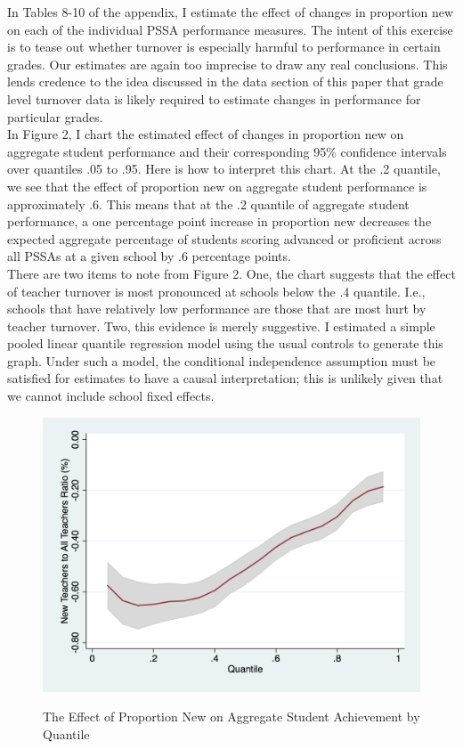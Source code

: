 \documentclass[12pt]{report}
\begin{document}
\indent In Tables 8-10 of the appendix, I estimate the effect of changes in proportion new on each of the individual PSSA performance measures. The intent of this exercise is to tease out whether turnover is especially harmful to performance in certain grades. Our estimates are again too imprecise to draw any real conclusions. This lends credence to the idea discussed in the data section of this paper that grade level turnover data is likely required to estimate changes in performance for particular grades.\\
\indent In Figure 2, I chart the estimated effect of changes in proportion new on aggregate student performance and their corresponding 95\% confidence intervals over quantiles .05 to .95. Here is how to interpret this chart. At the .2 quantile, we see that the effect of proportion new on aggregate student performance is approximately .6. This means that at the .2 quantile of aggregate student performance, a one percentage point increase in proportion new decreases the expected aggregate percentage of students scoring advanced or proficient across all PSSAs at a given school by .6 percentage points. \\
\indent There are two items to note from Figure 2. One, the chart suggests that the effect of teacher turnover is most pronounced at schools below the .4 quantile. I.e., schools that have relatively low performance are those that are most hurt by teacher turnover. Two, this evidence is merely suggestive. I estimated a simple pooled linear quantile regression model using the usual controls to generate this graph. Under such a model, the conditional independence assumption must be satisfied for estimates to have a causal interpretation; this is unlikely given that we cannot include school fixed effects. 

\begin{figure}[!htb]
    \centering
      \caption{The Effect of Proportion New on Aggregate Student Achievement by Quantile}
    \includegraphics[frame, scale=0.25]{tt_effect_by_quantile.png}
    \label{fig:my_label}
\end{figure}
%
\end{document}
